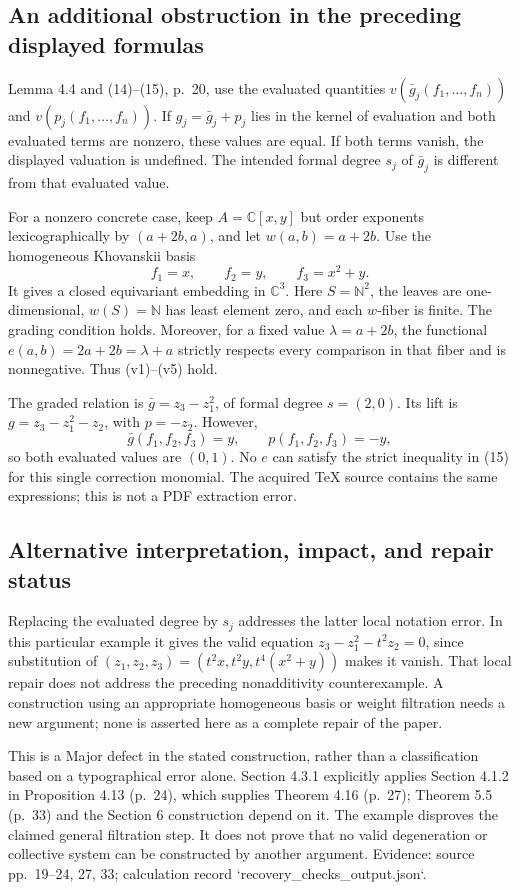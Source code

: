 \documentclass[10pt]{article}
\begin{document}
\subsection*{An additional obstruction in the preceding displayed formulas}
Lemma 4.4 and (14)–(15), p. 20, use the evaluated quantities \(v(\bar g_j(f_1,\ldots,f_n))\) and \(v(p_j(f_1,\ldots,f_n))\). If \(g_j=\bar g_j+p_j\) lies in the kernel of evaluation and both evaluated terms are nonzero, these values are equal. If both terms vanish, the displayed valuation is undefined. The intended formal degree \(s_j\) of \(\bar g_j\) is different from that evaluated value.\par
For a nonzero concrete case, keep \(A=\mathbb C[x,y]\) but order exponents lexicographically by \((a+2b,a)\), and let \(w(a,b)=a+2b\). Use the homogeneous Khovanskii basis \[f_1=x,\qquad f_2=y,\qquad f_3=x^2+y .\] It gives a closed equivariant embedding in \(\mathbb C^3\). Here \(S=\mathbb N^2\), the leaves are one-dimensional, \(w(S)=\mathbb N\) has least element zero, and each \(w\)-fiber is finite. The grading condition holds. Moreover, for a fixed value \(\lambda=a+2b\), the functional \(e(a,b)=2a+2b=\lambda+a\) strictly respects every comparison in that fiber and is nonnegative. Thus (v1)–(v5) hold.\par
The graded relation is \(\bar g=z_3-z_1^2\), of formal degree \(s=(2,0)\). Its lift is \(g=z_3-z_1^2-z_2\), with \(p=-z_2\). However, \[\bar g(f_1,f_2,f_3)=y,\qquad p(f_1,f_2,f_3)=-y,\] so both evaluated values are \((0,1)\). No \(e\) can satisfy the strict inequality in (15) for this single correction monomial. The acquired TeX source contains the same expressions; this is not a PDF extraction error.\par
\subsection*{Alternative interpretation, impact, and repair status}
Replacing the evaluated degree by \(s_j\) addresses the latter local notation error. In this particular example it gives the valid equation \(z_3-z_1^2-t^2z_2=0\), since substitution of \((z_1,z_2,z_3)=(t^2x,t^2y,t^4(x^2+y))\) makes it vanish. That local repair does not address the preceding nonadditivity counterexample. A construction using an appropriate homogeneous basis or weight filtration needs a new argument; none is asserted here as a complete repair of the paper.\par
This is a Major defect in the stated construction, rather than a classification based on a typographical error alone. Section 4.3.1 explicitly applies Section 4.1.2 in Proposition 4.13 (p. 24), which supplies Theorem 4.16 (p. 27); Theorem 5.5 (p. 33) and the Section 6 construction depend on it. The example disproves the claimed general filtration step. It does not prove that no valid degeneration or collective system can be constructed by another argument. Evidence: source pp. 19–24, 27, 33; calculation record `recovery\_checks\_output.json`.\par
\end{document}
